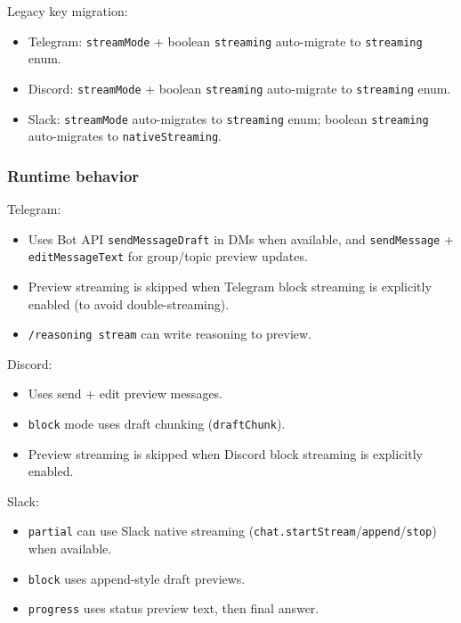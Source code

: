 Legacy key migration:

\begin{itemize}
  \item Telegram: \texttt{streamMode} + boolean \texttt{streaming} auto-migrate to \texttt{streaming} enum.
  \item Discord: \texttt{streamMode} + boolean \texttt{streaming} auto-migrate to \texttt{streaming} enum.
  \item Slack: \texttt{streamMode} auto-migrates to \texttt{streaming} enum; boolean \texttt{streaming} auto-migrates to \texttt{nativeStreaming}.
\end{itemize}


\subsubsection{Runtime behavior}


Telegram:

\begin{itemize}
  \item Uses Bot API \texttt{sendMessageDraft} in DMs when available, and \texttt{sendMessage} + \texttt{editMessageText} for group/topic preview updates.
  \item Preview streaming is skipped when Telegram block streaming is explicitly enabled (to avoid double-streaming).
  \item \texttt{/reasoning stream} can write reasoning to preview.
\end{itemize}


Discord:

\begin{itemize}
  \item Uses send + edit preview messages.
  \item \texttt{block} mode uses draft chunking (\texttt{draftChunk}).
  \item Preview streaming is skipped when Discord block streaming is explicitly enabled.
\end{itemize}


Slack:

\begin{itemize}
  \item \texttt{partial} can use Slack native streaming (\texttt{chat.startStream}/\texttt{append}/\texttt{stop}) when available.
  \item \texttt{block} uses append-style draft previews.
  \item \texttt{progress} uses status preview text, then final answer.
\end{itemize}



